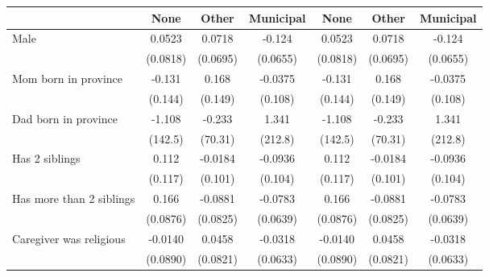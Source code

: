 {
\def\sym#1{\ifmmode^{#1}\else\(^{#1}\)\fi}
\begin{tabular}{l*{6}{c}}
\toprule
                    &\multicolumn{1}{c}{None}&\multicolumn{1}{c}{Other}&\multicolumn{1}{c}{Municipal}&\multicolumn{1}{c}{None}&\multicolumn{1}{c}{Other}&\multicolumn{1}{c}{Municipal}\\
\midrule
Male                &      0.0523         &      0.0718         &      -0.124         &      0.0523         &      0.0718         &      -0.124         \\
                    &    (0.0818)         &    (0.0695)         &    (0.0655)         &    (0.0818)         &    (0.0695)         &    (0.0655)         \\
\addlinespace
Mom born in province&      -0.131         &       0.168         &     -0.0375         &      -0.131         &       0.168         &     -0.0375         \\
                    &     (0.144)         &     (0.149)         &     (0.108)         &     (0.144)         &     (0.149)         &     (0.108)         \\
\addlinespace
Dad born in province&      -1.108         &      -0.233         &       1.341         &      -1.108         &      -0.233         &       1.341         \\
                    &     (142.5)         &     (70.31)         &     (212.8)         &     (142.5)         &     (70.31)         &     (212.8)         \\
\addlinespace
Has 2 siblings      &       0.112         &     -0.0184         &     -0.0936         &       0.112         &     -0.0184         &     -0.0936         \\
                    &     (0.117)         &     (0.101)         &     (0.104)         &     (0.117)         &     (0.101)         &     (0.104)         \\
\addlinespace
Has more than 2 siblings&       0.166         &     -0.0881         &     -0.0783         &       0.166         &     -0.0881         &     -0.0783         \\
                    &    (0.0876)         &    (0.0825)         &    (0.0639)         &    (0.0876)         &    (0.0825)         &    (0.0639)         \\
\addlinespace
Caregiver was religious&     -0.0140         &      0.0458         &     -0.0318         &     -0.0140         &      0.0458         &     -0.0318         \\
                    &    (0.0890)         &    (0.0821)         &    (0.0633)         &    (0.0890)         &    (0.0821)         &    (0.0633)         \\

\end{tabular}}
